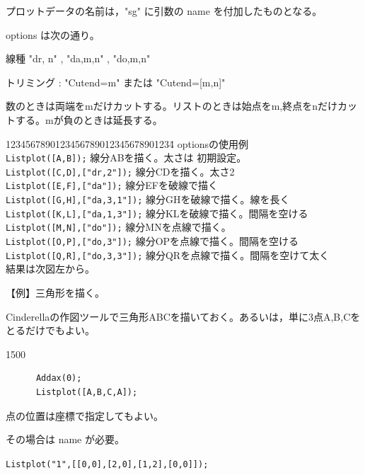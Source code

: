 \documentclass[papersize,a4paper,12pt,uplatex]{jsarticle}
\begin{document}
\begin{description}
プロットデータの名前は，"sg" に引数の name を付加したものとなる。

 options は次の通り。

線種   "dr, n"  , "da,m,n" , "do,m,n"

トリミング :  "Cutend=m" または "Cutend=[m,n]" 

数のときは両端をmだけカットする。リストのときは始点をm,終点をnだけカットする。mが負のときは延長する。

\begin{tabbing}
1234567890123456789012345678901234\=\kill
  optionsの使用例\\
    \verb|Listplot([A,B]);|            \>線分ABを描く。太さは 初期設定。\\
    \verb|Listplot([C,D],["dr,2"]);|     \>線分CDを描く。太さ2\\
    \verb|Listplot([E,F],["da"]);|       \>線分EFを破線で描く\\
    \verb|Listplot([G,H],["da,3,1"]);|   \>線分GHを破線で描く。線を長く\\
    \verb|Listplot([K,L],["da,1,3"]);|    \>線分KLを破線で描く。間隔を空ける\\
    \verb|Listplot([M,N],["do"]);|      \>線分MNを点線で描く。\\
    \verb|Listplot([O,P],["do,3"]);|     \>線分OPを点線で描く。間隔を空ける\\
    \verb|Listplot([Q,R],["do,3,3"]);|   \>線分QRを点線で描く。間隔を空けて太く\\
結果は次図左から。
\end{tabbing}
    \begin{center} \end{center}

【例】三角形を描く。

  Cinderellaの作図ツールで三角形ABCを描いておく。あるいは，単に3点A,B,Cをとるだけでもよい。

\begin{layer}{150}{0}
\end{layer}
\hspace{20mm}

\begin{verbatim}
      Addax(0);
      Listplot([A,B,C,A]);
\end{verbatim}

点の位置は座標で指定してもよい。

その場合は name が必要。

\hspace{10mm} \verb|Listplot("1",[[0,0],[2,0],[1,2],[0,0]]);|


\end{description}
\end{document}
